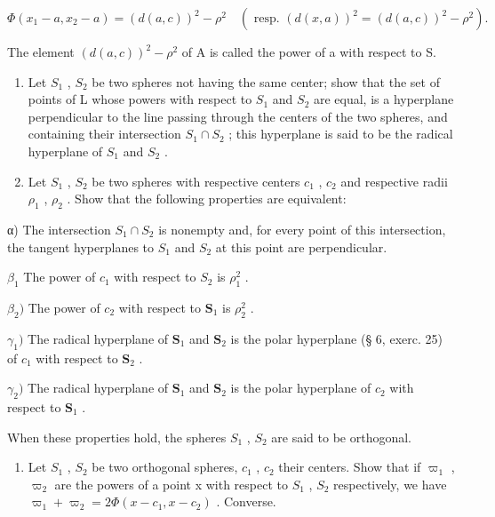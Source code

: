 \[
\Phi (x _ {1} - a, x _ {2} - a) = (d (a, c)) ^ {2} - \rho^ {2} \quad (\text { resp. } (d (x, a)) ^ {2} = (d (a, c)) ^ {2} - \rho^ {2}).
\]

The element \((d(a, c))^{2} - \rho^{2}\) of A is called the power of a with respect to S.

\begin{enumerate}
\def\labelenumi{\alph{enumi})}
\setcounter{enumi}{2}
\item
  Let \(S_{1}\) , \(S_{2}\) be two spheres not having the same center; show that the set of points of L whose powers with respect to \(S_{1}\) and \(S_{2}\) are equal, is a hyperplane perpendicular to the line passing through the centers of the two spheres, and containing their intersection \(S_{1} \cap S_{2}\) ; this hyperplane is said to be the radical hyperplane of \(S_{1}\) and \(S_{2}\) .
\item
  Let \(S_{1}\) , \(S_{2}\) be two spheres with respective centers \(c_{1}\) , \(c_{2}\) and respective radii \(\rho_{1}\) , \(\rho_{2}\) . Show that the following properties are equivalent:
\end{enumerate}

α) The intersection \(S_{1} \cap S_{2}\) is nonempty and, for every point of this intersection, the tangent hyperplanes to \(S_{1}\) and \(S_{2}\) at this point are perpendicular.

\(\beta_{1}\) The power of \(c_{1}\) with respect to \(S_{2}\) is \(\rho_{1}^{2}\) .

\(\beta_{2})\) The power of \(c_{2}\) with respect to \(\mathbf{S}_{1}\) is \(\rho_{2}^{2}\) .

\(\gamma_{1})\) The radical hyperplane of \(\mathbf{S}_{1}\) and \(\mathbf{S}_{2}\) is the polar hyperplane (§ 6, exerc. 25) of \(c_{1}\) with respect to \(\mathbf{S}_{2}\) .

\(\gamma_{2})\) The radical hyperplane of \(\mathbf{S}_{1}\) and \(\mathbf{S}_{2}\) is the polar hyperplane of \(c_{2}\) with respect to \(\mathbf{S}_{1}\) .

When these properties hold, the spheres \(S_{1}\) , \(S_{2}\) are said to be orthogonal.

\begin{enumerate}
\def\labelenumi{\alph{enumi})}
\setcounter{enumi}{4}
\tightlist
\item
  Let \(S_{1}\) , \(S_{2}\) be two orthogonal spheres, \(c_{1}\) , \(c_{2}\) their centers. Show that if \(\varpi_{1}\) , \(\varpi_{2}\) are the powers of a point x with respect to \(S_{1}\) , \(S_{2}\) respectively, we have \(\varpi_{1} + \varpi_{2} = 2\Phi(x - c_{1}, x - c_{2})\) . Converse.
\end{enumerate}

